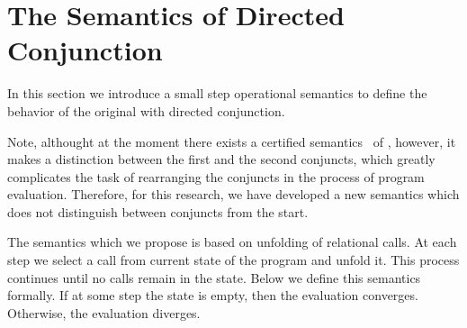\section{The Semantics of Directed Conjunction}
In this section we introduce a small step operational semantics to define the behavior of the original \mk with directed conjunction. 


Note, althought at the moment there exists a certified semantics~\cite{fair:semantics} of \mk, however, it makes a distinction between the first
and the second conjuncts, which greatly complicates the task of rearranging the conjuncts in the process of program evaluation. 
Therefore, for this research, we have developed a new semantics which does not distinguish between conjuncts from the start.


The semantics which we propose is based on unfolding of relational calls. At each step we select a call from current state of the program and unfold it.
This process continues until no calls remain in the state. Below we define this semantics formally. If at some step the state is empty, then the evaluation converges. Otherwise, the evaluation diverges.


